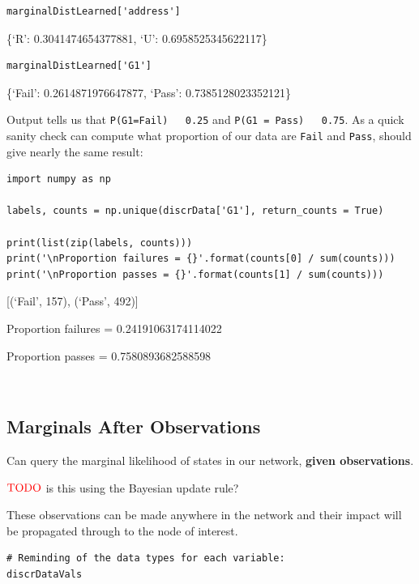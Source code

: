 \documentclass[
]{article}
\begin{document}
\begin{verbatim}
marginalDistLearned['address']
\end{verbatim}

\{`R': 0.3041474654377881, `U': 0.6958525345622117\}

\begin{verbatim}
marginalDistLearned['G1']
\end{verbatim}

\{`Fail': 0.2614871976647877, `Pass': 0.7385128023352121\}

Output tells us that \texttt{P(G1=Fail) ~ 0.25} and
\texttt{P(G1 = Pass) ~ 0.75}. As a quick sanity check can
compute what proportion of our data are \texttt{Fail} and
\texttt{Pass}, should give nearly the same result:

\begin{verbatim}
import numpy as np

labels, counts = np.unique(discrData['G1'], return_counts = True)

print(list(zip(labels, counts)))
print('\nProportion failures = {}'.format(counts[0] / sum(counts)))
print('\nProportion passes = {}'.format(counts[1] / sum(counts)))
\end{verbatim}

{[}(`Fail', 157), (`Pass', 492){]}

Proportion failures = 0.24191063174114022

Proportion passes = 0.7580893682588598

\begin{verbatim}


\end{verbatim}

\hypertarget{marginals-after-observations}{%
\subsection{Marginals After
Observations}\label{marginals-after-observations}}

Can query the marginal likelihood of states in our network,
\textbf{given observations}.

\(\color{red}{\text{TODO}}\) is this using the Bayesian update rule?

These observations can be made anywhere in the network and their impact
will be propagated through to the node of interest.

\begin{verbatim}
# Reminding of the data types for each variable:
discrDataVals
\end{verbatim}
\end{document}
